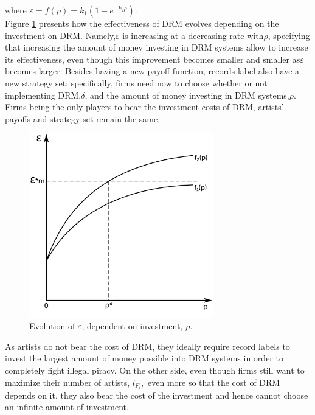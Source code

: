 \documentclass[a4paper,12pt]{article}
\numberwithin{equation}{section}
\begin{document}
where $\varepsilon=f(\rho)=k_{1}(1-e^{-k_{2}\rho})$.\\

Figure \ref{Fig:EpsilonEvolution} presents how the effectiveness of DRM evolves depending on
the investment on DRM. Namely,$\varepsilon$ is increasing at a decreasing
rate with$\rho$, specifying that increasing the amount of money investing
in DRM systems allow to increase its effectiveness, even though this
improvement becomes smaller and smaller as$\varepsilon$ becomes larger.
Besides having a new payoff function, records label also have a new
strategy set; specifically, firms need now to choose whether or not
implementing DRM,$\delta$, and the amount of money investing in DRM
systems,$\rho$. Firms being the only players to bear the investment
costs of DRM, artists' payoffs and strategy set remain the same.\\

\begin{figure}[h!]
\centering
\includegraphics[width=8cm]{Graphics/graph1.pdf}
\caption{Evolution of $\varepsilon$, dependent on investment, $\rho$.}
\label{Fig:EpsilonEvolution}
\end{figure}

As artists do not bear the cost of DRM, they ideally require record
labels to invest the largest amount of money possible into DRM systems
in order to completely fight illegal piracy. On the other side, even
though firms still want to maximize their number of artists, $l_{F_{i}},$
even more so that the cost of DRM depends on it, they also bear the
cost of the investment and hence cannot choose an infinite amount
of investment.\\
\end{document}
